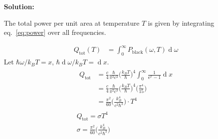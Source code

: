 \documentclass[11pt,letterpaper]{article}
\renewcommand{\d}[1]{\ensuremath{\operatorname{d}\!{#1}}}
\newenvironment{solution}{
\bigbreak
\noindent
\textbf{Solution:}
}
\numberwithin{equation}{section}
\numberwithin{figure}{section}
\begin{document}
\begin{solution}
The total power per unit area at temperature $T$ is given by integrating eq.~\ref{eq:power} over all frequencies.

\begin{align}
Q_\text{tot}(T) &= \int_0^\infty P_\text{black}(\omega,T)\d{\omega}
\end{align}
Let $ \hbar \omega/k_BT = x$, $\hbar\d{\omega}/k_BT = \d{x}$.
\begin{gather}
	\begin{aligned}
Q_\text{tot} &= \frac{c}{4} \frac{\hbar}{\pi^2c^3} \bigg( \frac{k_BT}{\hbar} \bigg)^4 \int_0^\infty \frac{1}{\text{e}^x - 1} \d{x}
\\
&= \frac{c}{4} \frac{\hbar}{\pi^2c^3} \bigg( \frac{k_BT}{\hbar} \bigg)^4 \bigg( \frac{\pi^4}{15} \bigg)
\\
&= \frac{\pi^2}{60}\bigg( \frac{k_B^4}{c^2 \hbar^3}\bigg) \cdot T^4
\end{aligned}
\\
\boxed{Q_\text{tot} = \sigma T^4}
\\
\boxed{\sigma = \frac{\pi^2}{60}\bigg( \frac{k_B^4}{c^2 \hbar^3}\bigg)}
\end{gather}

\end{solution}
\end{document}
